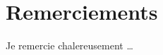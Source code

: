 
\chapter*{Remerciements} %
\label{ch:remerciements}

    Je remercie chalereusement \dots
    
    \lipsum[1-3]

